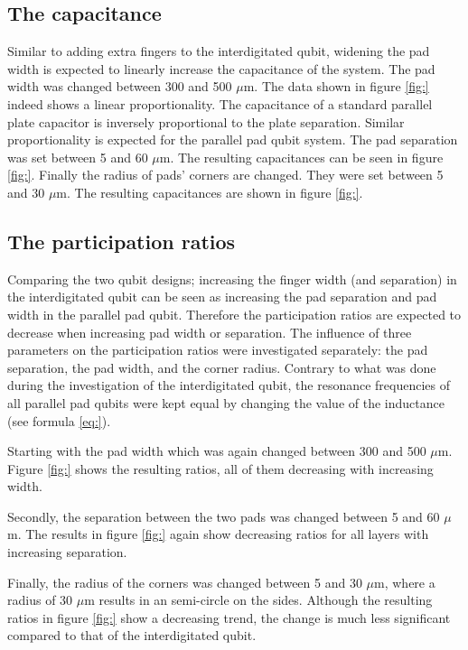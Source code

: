 \subsection{The capacitance}
Similar to adding extra fingers to the interdigitated qubit, widening the pad width is expected to linearly increase the capacitance of the system. The pad width was changed between 300 and 500 \(\mu\)m. The data shown in figure \ref{fig:} indeed shows a linear proportionality.
The capacitance of a standard parallel plate capacitor is inversely proportional to the plate separation. Similar proportionality is expected for the parallel pad qubit system. The pad separation was set between 5 and 60 \(\mu\)m. The resulting capacitances can be seen in figure \ref{fig:}.
Finally the radius of pads' corners are changed. They were set between 5 and 30 \(\mu\)m. The resulting capacitances are shown in figure \ref{fig:}.

\subsection{The participation ratios}
 Comparing the two qubit designs; increasing the finger width (and separation) in the interdigitated qubit can be seen as increasing the pad separation and pad width in the parallel pad qubit. Therefore the participation ratios are expected to decrease when increasing pad width or separation. The influence of three parameters on the participation ratios were investigated separately: the pad separation, the pad width, and the corner radius. Contrary to what was done during the investigation of the interdigitated qubit, the resonance frequencies of all parallel pad qubits were kept equal by changing the value of the inductance (see formula \eqref{eq:}). 
 
 Starting with the pad width which was again changed between 300 and 500 \(\mu\)m. Figure \ref{fig:} shows the resulting ratios, all of them decreasing with increasing width.
 
 Secondly, the separation between the two pads was changed between 5 and 60 \(\mu\)m. The results in figure \ref{fig:} again show decreasing ratios for all layers with increasing separation. 
 
 Finally, the radius of the corners was changed between 5 and 30 \(\mu\)m, where a radius of 30 \(\mu\)m results in an semi-circle on the sides. Although the resulting ratios in figure \ref{fig:} show a decreasing trend, the change is much less significant compared to that of the interdigitated qubit.
 

